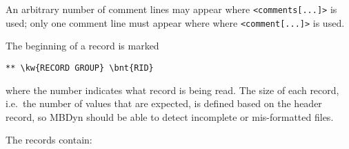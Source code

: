 An arbitrary number of comment lines may appear
where \texttt{<comments[...]>} is used;
only one comment line must appear where
where \texttt{<comment[...]>} is used.

The beginning of a record is marked
\begin{Verbatim}[commandchars=\\\{\}]
** \kw{RECORD GROUP} \bnt{RID}
\end{Verbatim}
where the number  indicates what record is being read.
The size of each record, i.e.\ the number of values that are expected,
is defined based on the header record, so MBDyn should be able to detect
incomplete or mis-formatted files.

The records contain:
